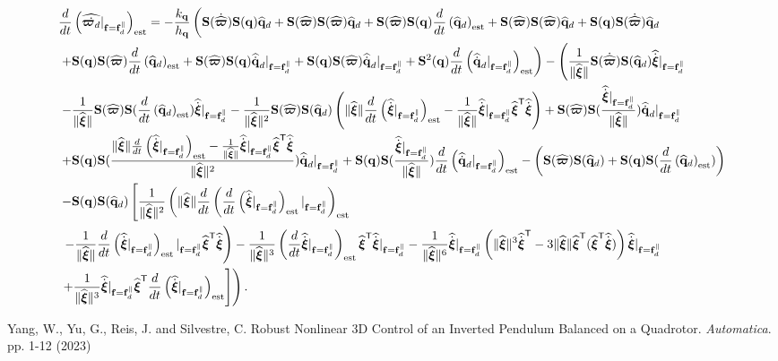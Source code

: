 \documentclass[journal,onecolumn]{IEEEtran}
\begin{document}
	\begin{align}
		&\frac{d}{dt}\LP\widehat{\dot{\bs{\varpi}_d}}|_{\f=\fd^{\|}}\RP_{\text{est}}=-\frac{k_{\dir}}{h_{\dir}}\left(\Skew{\dot{\widehat{\bs{\varpi}}}}\Skew{\dir}\qdhat+\Skew{\widehat{\bs{\varpi}}}\Skew{\widehat{\bs{\varpi}}}\qdhat+\Skew{\widehat{\bs{\varpi}}}\Skew{\dir}	\frac{d}{dt}\LP\qdhat\RP_{\text{est}}+\Skew{\widehat{\bs{\varpi}}}\Skew{\widehat{\bs{\varpi}}}\qdhat+\Skew{\dir}\Skew{\dot{\widehat{\bs{\varpi}}}}\qdhat\right.\nonumber\\
		&\left.+\Skew{\dir}\Skew{\widehat{\bs{\varpi}}}\frac{d}{dt}\LP\qdhat\RP_{\text{est}}+\Skew{\widehat{\bs{\varpi}}}\Skew{\dir}\qddothat|_{\f=\f_d^{\|}}+\Skew{\dir}\Skew{\widehat{\bs{\varpi}}}\qddothat|_{\f=\f_d^{\|}}+\Skew[2]{\dir}\frac{d}{dt}\LP\qddothat|_{\f=\f_d^{\|}}\RP_{\text{est}}\right) 
		-\left(\frac{1}{\|\widehat{\Xiq}\|}\Skew{\dot{\widehat{\bs{\varpi}}}}\Skew{\qdhat}\widehat{\dot{\Xiq}}|_{\f=\fd^{\|}}\right.\nonumber\\
		&\left.-\frac{1}{\|\widehat{\Xiq}\|}\Skew{\widehat{\bs{\varpi}}}\Skew{\frac{d}{dt}\LP\qdhat\RP_{\text{est}}}\widehat{\dot{\Xiq}}|_{\f=\fd^{\|}} - \frac{1}{\|\widehat{\Xiq}\|^2}\Skew{\widehat{\bs{\varpi}}}\Skew{\qdhat}\LP\|\widehat{\Xiq}\|\frac{d}{dt}\LP\widehat{\dot{\Xiq}}|_{\f=\fd^{\|}}\RP_{\text{est}}-\frac{1}{\|\widehat{\Xiq}\|}\widehat{\dot{\Xiq}}|_{\f=\fd^{\|}}\widehat{\Xiq}\trs\widehat{\dot{\Xiq}}\RP+\Skew{\widehat{\bs{\varpi}}}\Skew{\frac{\widehat{\dot{\Xiq}}|_{\f=\fd^{\|}}}{\|\widehat{\Xiq}\|}}\qddothat|_{\f=\f_d^{\|}}\right.\nonumber\\
		&\left.+\Skew{\dir}\Skew{\frac{\|\widehat{\Xiq}\|\frac{d}{dt}\LP\widehat{\dot{\Xiq}}|_{\f=\fd^{\|}}\RP_{\text{est}}-\frac{1}{\|\widehat{\Xiq}\|}\widehat{\dot{\Xiq}}|_{\f=\fd^{\|}}\widehat{\Xiq}\trs\widehat{\dot{\Xiq}}}{\|\widehat{\Xiq}\|^2}}\qddothat|_{\f=\f_d^{\|}}+\Skew{\dir}\Skew{\frac{\widehat{\dot{\Xiq}}|_{\f=\fd^{\|}}}{\|\widehat{\Xiq}\|}}\frac{d}{dt}\LP\qddothat|_{\f=\f_d^{\|}}\RP_{\text{est}} - \LP\Skew{\widehat{\bs{\varpi}}}\Skew{\qdhat} + \Skew{\dir}\Skew{\frac{d}{dt}\LP\qdhat\RP_{\text{est}}}\RP \right.\nonumber\\
		&\left.-\Skew{\dir}\Skew{\qdhat}\left[\frac{1}{\|\widehat{\Xiq}\|^2}\left(\|\widehat{\Xiq}\|\frac{d}{dt}\LP\frac{d}{dt}\LP\widehat{\dot{\Xiq}}|_{\f=\fd^{\|}}\RP_{\text{est}}|_{\f=\fd^{\|}}\RP_{\text{est}}\right.\right.\right.\nonumber\\
		&\left.\left.\left.-\frac{1}{\|\widehat{\Xiq}\|}\frac{d}{dt}\LP\widehat{\dot{\Xiq}}|_{\f=\fd^{\|}}\RP_{\text{est}}|_{\f=\fd^{\|}}\widehat{\Xiq}\trs\widehat{\dot{\Xiq}}\right)-\frac{1}{\|\widehat{\Xiq}\|^3}\LP\frac{d}{dt}\widehat{\dot{\Xiq}}|_{\f=\fd^{\|}}\RP_{\text{est}}\widehat{\Xiq}\trs\widehat{\dot{\Xiq}}|_{\f=\fd^{\|}}-\frac{1}{\|\widehat{\Xiq}\|^6}\widehat{\dot{\Xiq}}|_{\f=\fd^{\|}}\LP\|\widehat{\Xiq}\|^3\widehat{\dot{\Xiq}}\trs-3\|\widehat{\Xiq}\|\widehat{\Xiq}\trs(\widehat{\Xiq}\trs\widehat{\dot{\Xiq}})\RP\widehat{\dot{\Xiq}}|_{\f=\fd^{\|}}\right.\right.\nonumber\\
		&\left.\left.+\frac{1}{\|\widehat{\Xiq}\|^3}\widehat{\dot{\Xiq}}|_{\f=\fd^{\|}}\widehat{\Xiq}\trs\frac{d}{dt}\LP\widehat{\dot{\Xiq}}|_{\f=\fd^{\|}}\RP_{\text{est}}\right]\right).
	\end{align} 

\begin{thebibliography}{9}
Yang, W., Yu, G., Reis, J. and Silvestre, C. Robust Nonlinear 3D Control of an Inverted Pendulum Balanced on a Quadrotor. {\em Automatica}. pp. 1-12 (2023)
\end{thebibliography}
\end{document}
